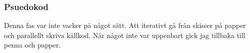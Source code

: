 \documentclass[../main.tex]{subfiles}
\begin{document}
\subsubsection{Psuedokod}
Denna fas var inte vacker på något sätt. Att iterativt gå från skisser på papper och parallellt skriva källkod. När något inte var uppenbart gick jag tillbaka till penna och papper.







\newpage
\end{document}
